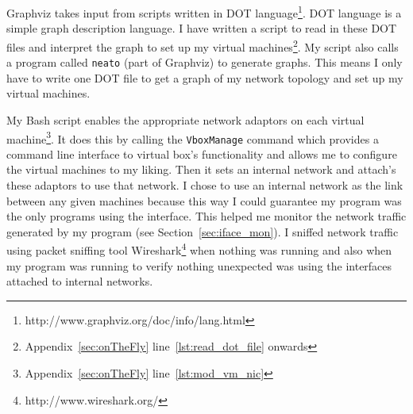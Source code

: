 \documentclass[12pt]{article}
\begin{document}
Graphviz takes input from scripts written in DOT language\footnote{
http://www.graphviz.org/doc/info/lang.html}. DOT language is a simple
graph description language.
I have written a script to read in these DOT files and interpret
the graph to set up my virtual machines\footnote{Appendix~\ref{sec:onTheFly}
 line~\ref{lst:read_dot_file} onwards}.
My script also calls a program called \texttt{neato} (part of Graphviz) to generate graphs.
This means I only have to write one DOT file to get a graph of
my network topology and set up my virtual machines.

My Bash script enables the appropriate network adaptors on
each virtual machine\footnote{Appendix~\ref{sec:onTheFly} line~\ref{lst:mod_vm_nic}}.
It does this by calling the \texttt{VboxManage} command which provides
a command line interface to virtual box's functionality and allows
me to configure the virtual machines to my liking.
Then it sets an internal network and attach's these adaptors to use that
network. 
I chose to use an internal network
as the link between any given machines because this way I could
guarantee my program
was the only programs using the interface.
This helped me monitor the network traffic generated by
my program (see Section~\ref{sec:iface_mon}).
I sniffed network traffic using packet sniffing tool
Wireshark\footnote{http://www.wireshark.org/}
when nothing was running and also when my program was running
to verify nothing unexpected was using the interfaces attached to
internal networks.

\end{document}
